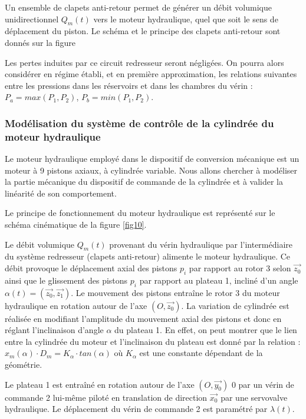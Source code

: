 Un ensemble de clapets anti-retour permet de générer un débit volumique unidirectionnel $Q_m(t)$ vers le moteur hydraulique, quel que soit le sens de déplacement du piston. Le schéma et le principe des clapets anti-retour sont donnés sur la figure 

Les pertes induites par ce circuit redresseur seront négligées. On pourra alors considérer en régime établi, et en première approximation, les relations suivantes entre les pressions dans les réservoirs et dans les chambres du vérin : $P_a=max(P_1,P_2)$, $P_b=min(P_1,P_2)$.


\subsubsection{Modélisation du système de contrôle de la cylindrée du moteur hydraulique}

Le moteur hydraulique employé dans le dispositif de conversion mécanique est un moteur à 9 pistons axiaux, à cylindrée variable. Nous allons chercher à modéliser la partie mécanique du dispositif de commande de la cylindrée et à valider la linéarité de son comportement.

Le principe de fonctionnement du moteur hydraulique est représenté sur le schéma cinématique de la figure \ref{fig10}.

Le débit volumique $Q_m(t)$ provenant du vérin hydraulique par l'intermédiaire du système redresseur (clapets anti-retour) alimente le moteur hydraulique. Ce débit provoque le déplacement axial des pistons $p_i$ par rapport au rotor 3 selon $\vec{z_0}$ ainsi que le glissement des pistons $p_i$ par rapport
au plateau 1, incliné d'un angle $\alpha (t)=(\vec{z_0},\vec{z_1})$. Le mouvement des pistons entraîne le rotor 3 du moteur hydraulique en rotation autour de l'axe $(O, \vec{z_0})$. La variation de cylindrée est réalisée en
modifiant l'amplitude du mouvement axial des pistons et donc en réglant l'inclinaison d'angle $\alpha$ du plateau 1. En effet, on peut montrer que le lien entre la cylindrée du moteur et l'inclinaison du plateau est donné par la relation : $x_m(\alpha)\cdot D_m=K_\alpha\cdot tan(\alpha)$ où $K_\alpha$ est une constante dépendant de la géométrie.

Le plateau 1 est entraîné en rotation autour de l'axe $(O,\vec{y_0})$
0 par un vérin de commande 2 lui-même piloté en translation de direction $\vec{x_0}$ par une servovalve hydraulique. Le déplacement du vérin de
commande 2 est paramétré par $\lambda (t)$.

